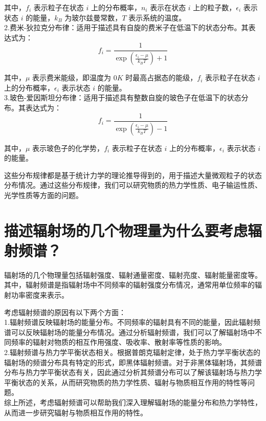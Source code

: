 \documentclass[12pt, a4paper, oneside]{article}
\begin{document}
\begin{spacing}{2.0}
其中，$f_i$ 表示粒子在状态 $i$ 上的分布概率，$n_i$ 表示在状态 $i$ 上的粒子数，$\epsilon_i$ 表示状态 $i$ 的能量，$k_B$ 为玻尔兹曼常数，$T$ 表示系统的温度。
\\
2.费米-狄拉克分布律：适用于描述具有自旋的费米子在低温下的状态分布。其表达式为：
\begin{equation}
f_i = \frac{1}{\exp\left(\frac{\epsilon_i - \mu}{k_BT}\right) + 1}
\end{equation}

其中，$\mu$ 表示费米能级，即温度为 $0K$ 时最高占据态的能级，$f_i$ 表示粒子在状态 $i$ 上的分布概率，$\epsilon_i$ 表示状态 $i$ 的能量。
\\
3.玻色-爱因斯坦分布律：适用于描述具有整数自旋的玻色子在低温下的状态分布。其表达式为：
\begin{equation}
f_i = \frac{1}{\exp\left(\frac{\epsilon_i - \mu}{k_BT}\right) - 1}
\end{equation}

其中，$\mu$ 表示玻色子的化学势，$f_i$ 表示粒子在状态 $i$ 上的分布概率，$\epsilon_i$ 表示状态 $i$ 的能量。

这些分布规律都是基于统计力学的理论推导得到的，用于描述大量微观粒子的状态分布情况。通过这些分布规律，我们可以研究物质的热力学性质、电子输运性质、光学性质等方面的问题。


\section{描述辐射场的几个物理量为什么要考虑辐射频谱？   }
辐射场的几个物理量包括辐射强度、辐射通量密度、辐射亮度、辐射能量密度等。其中，辐射频谱是指辐射场中不同频率的辐射强度分布情况，通常用单位频率的辐射功率密度来表示。

考虑辐射频谱的原因有以下两个方面：\\

1.辐射频谱反映辐射场的能量分布。不同频率的辐射具有不同的能量，因此辐射频谱可以反映辐射场的能量分布情况。通过分析辐射频谱，我们可以了解辐射场中不同频率的辐射对物质的相互作用强度、吸收率、散射率等性质的影响。
\\
2.辐射频谱与热力学平衡状态相关。根据普朗克辐射定律，处于热力学平衡状态的辐射场的频谱分布具有特定的形式，即黑体辐射频谱。对于非黑体辐射场，其频谱分布与热力学平衡状态有关，因此通过分析其频谱分布可以了解该辐射场与热力学平衡状态的关系，从而研究物质的热力学性质、辐射与物质相互作用的特性等问题。
\\
综上所述，考虑辐射频谱可以帮助我们深入理解辐射场的能量分布和热力学特性，从而进一步研究辐射与物质相互作用的特性。




\end{spacing}
\end{document}

